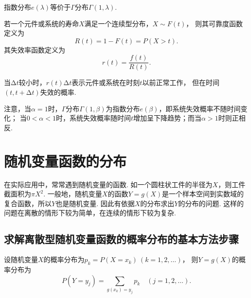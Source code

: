 指数分布\(e(\lambda)\)等价于\(\Gamma\)分布\(\Gamma(1,\lambda)\).

\begin{definition}
若一个元件或系统的寿命\(X\)满足一个连续型分布，\(X \sim F(t)\)，%
则其可靠度函数定义为\[
R(t) = 1 - F(t) = P(X > t).
\]其失效率函数定义为\[
r(t) = \frac{f(t)}{R(t)}.
\]

当\(\increment t\)较小时，\(r(t) \increment t\)表示元件或系统在时刻\(t\)以前正常工作，%
但在时间\((t,t+\increment t)\)失效的概率.
\end{definition}

注意，当\(\alpha = 1\)时，\(\Gamma\)分布\(\Gamma(1,\beta)\)为指数分布\(e(\beta)\)，即系统失效概率不随时间变化；
当\(0 < \alpha < 1\)时，系统失效概率随时间\(t\)增加呈下降趋势；而当\(\alpha > 1\)时则正相反.

\section{随机变量函数的分布}
在实际应用中，常常遇到随机变量的函数.
如一个圆柱状工件的半径为\(X\)，则工件截面积为\(\pi X^2\).
一般地，随机变量\(X\)的函数\(Y=g(X)\)是一个样本空间到实数域的复合函数，所以\(Y\)也是随机变量.
因此有依据\(X\)的分布求出\(Y\)的分布的问题.
这样的问题在离散的情形下较为简单，在连续的情形下较为复杂.

\subsection{求解离散型随机变量函数的概率分布的基本方法步骤}
设随机变量\(X\)的概率分布为\(p_k = P(X = x_k)\ (k=1,2,\dotsc)\)，%
则\(Y = g(X)\)的概率分布为\[
P(Y = y_j) = \sum\limits_{g(x_k) = y_j} p_k
\quad(j=1,2,\dotsc).
\]

